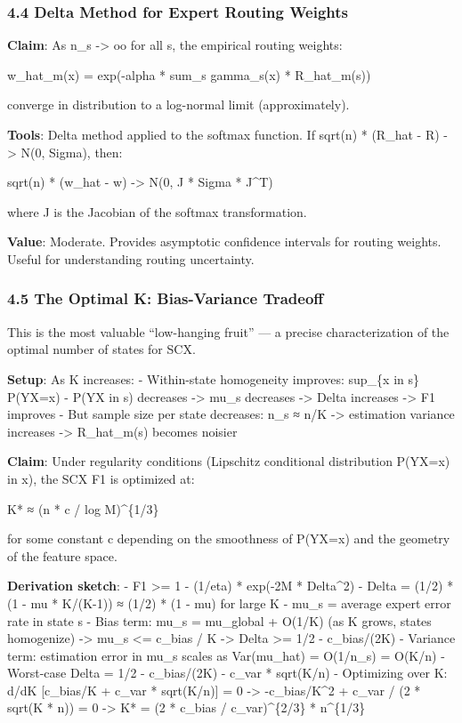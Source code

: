 \documentclass[
  12pt,
]{article}
\begin{document}
\subsubsection{4.4 Delta Method for Expert Routing
Weights}\label{delta-method-for-expert-routing-weights}

\textbf{Claim}: As n\_s -\textgreater{} oo for all s, the empirical
routing weights:

w\_hat\_m(x) = exp(-alpha * sum\_s gamma\_s(x) * R\_hat\_m(s))

converge in distribution to a log-normal limit (approximately).

\textbf{Tools}: Delta method applied to the softmax function. If sqrt(n)
* (R\_hat - R) -\textgreater{} N(0, Sigma), then:

sqrt(n) * (w\_hat - w) -\textgreater{} N(0, J * Sigma * J\^{}T)

where J is the Jacobian of the softmax transformation.

\textbf{Value}: Moderate. Provides asymptotic confidence intervals for
routing weights. Useful for understanding routing uncertainty.

\subsubsection{4.5 The Optimal K: Bias-Variance
Tradeoff}\label{the-optimal-k-bias-variance-tradeoff}

This is the most valuable ``low-hanging fruit'' --- a precise
characterization of the optimal number of states for SCX.

\textbf{Setup}: As K increases: - Within-state homogeneity improves:
sup\_\{x in s\} \textbar P(Y\textbar X=x) - P(Y\textbar X in
s)\textbar{} decreases -\textgreater{} mu\_s decreases -\textgreater{}
Delta increases -\textgreater{} F1 improves - But sample size per state
decreases: n\_s ≈ n/K -\textgreater{} estimation variance increases
-\textgreater{} R\_hat\_m(s) becomes noisier

\textbf{Claim}: Under regularity conditions (Lipschitz conditional
distribution P(Y\textbar X=x) in x), the SCX F1 is optimized at:

K* ≈ (n * c / log M)\^{}\{1/3\}

for some constant c depending on the smoothness of P(Y\textbar X=x) and
the geometry of the feature space.

\textbf{Derivation sketch}: - F1 \textgreater= 1 - (1/eta) * exp(-2M *
Delta\^{}2) - Delta = (1/2) * (1 - mu * K/(K-1)) ≈ (1/2) * (1 - mu) for
large K - mu\_s = average expert error rate in state s - Bias term:
mu\_s = mu\_global + O(1/K) (as K grows, states homogenize)
-\textgreater{} mu\_s \textless= c\_bias / K -\textgreater{} Delta
\textgreater= 1/2 - c\_bias/(2K) - Variance term: estimation error in
mu\_s scales as Var(mu\_hat) = O(1/n\_s) = O(K/n) - Worst-case Delta =
1/2 - c\_bias/(2K) - c\_var * sqrt(K/n) - Optimizing over K: d/dK
{[}c\_bias/K + c\_var * sqrt(K/n){]} = 0 -\textgreater{} -c\_bias/K\^{}2
+ c\_var / (2 * sqrt(K * n)) = 0 -\textgreater{} K* = (2 * c\_bias /
c\_var)\^{}\{2/3\} * n\^{}\{1/3\}
\end{document}
